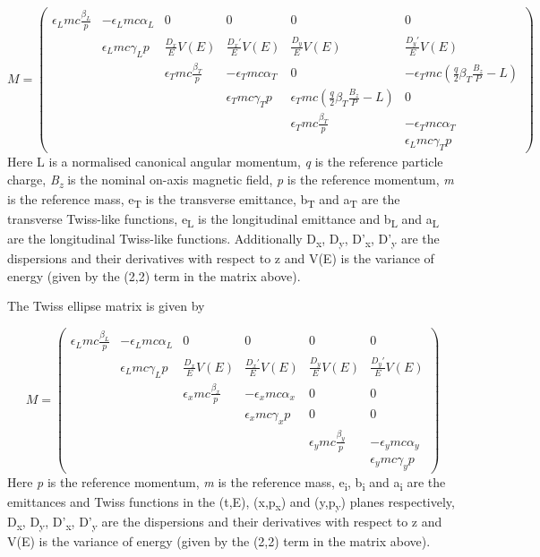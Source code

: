 \begin{equation*}
M=\left(\begin{matrix}\epsilon _Lmc\frac{\beta _L}{p}&-\epsilon _Lmc\alpha _L&0&0&0&0\\&\epsilon _Lmc\gamma
_Lp&\frac{D_x}{E}V(E)&\frac{D_x'}{E}V(E)&\frac{D_y}{E}V(E)&\frac{D_y'}{E}V(E)\\&&\epsilon _Tmc\frac{\beta _T}{p}&-\epsilon
_Tmc\alpha _T&0&-\epsilon _Tmc(\frac{q}{2}\beta _T\frac{B_z}{P}-L)\\&&&\epsilon _Tmc\gamma _Tp&\epsilon _Tmc(\frac{q}{
2}\beta _T\frac{B_z}{P}-L)&0\\&&&&\epsilon _Tmc\frac{\beta _T}{p}&-\epsilon _Tmc\alpha _T\\&&&&&\epsilon _Lmc\gamma
_Tp\end{matrix}\right)
\end{equation*}
Here L is a normalised canonical angular momentum, \textit{q} is the reference particle charge,
\textit{B}\textit{\textsubscript{z}} is the nominal on-axis magnetic field, \textit{p} is the reference momentum,
\textit{m} is the reference mass, e\textsubscript{T} is the transverse emittance, b\textsubscript{T} and
a\textsubscript{T} are the transverse Twiss-like functions, e\textsubscript{L} is the longitudinal emittance and
b\textsubscript{L} and a\textsubscript{L} are the longitudinal Twiss-like functions. Additionally D\textsubscript{x},
D\textsubscript{y}, D'\textsubscript{x}, D'\textsubscript{y} are the dispersions and their derivatives with respect to
z and V(E) is the variance of energy (given by the (2,2) term in the matrix above).

The Twiss ellipse matrix is given by

\begin{equation*}
M=\left(\begin{matrix}\epsilon _Lmc\frac{\beta _L}{p}&-\epsilon _Lmc\alpha _L&0&0&0&0\\&\epsilon _Lmc\gamma
_Lp&\frac{D_x}{E}V(E)&\frac{D_x'}{E}V(E)&\frac{D_y}{E}V(E)&\frac{D_y'}{E}V(E)\\&&\epsilon _xmc\frac{\beta _x}{p}&-\epsilon
_xmc\alpha _x&0&0\\&&&\epsilon _xmc\gamma _xp&0&0\\&&&&\epsilon _ymc\frac{\beta _y}{p}&-\epsilon _ymc\alpha
_y\\&&&&&\epsilon _ymc\gamma _yp\end{matrix}\right)
\end{equation*}
Here \textit{p} is the reference momentum, \textit{m} is the reference mass, e\textsubscript{i}, b\textsubscript{i} and
a\textsubscript{i} are the emittances and Twiss functions in the (t,E), (x,p\textsubscript{x}) and
(y,p\textsubscript{y}) planes respectively, D\textsubscript{x}, D\textsubscript{y}, D'\textsubscript{x},
D'\textsubscript{y} are the dispersions and their derivatives with respect to z and V(E) is the variance of energy
(given by the (2,2) term in the matrix above).

